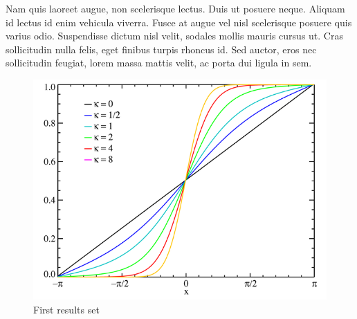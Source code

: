 Nam quis laoreet augue, non scelerisque lectus. Duis ut posuere neque. Aliquam id lectus id enim vehicula viverra. Fusce at augue vel nisl scelerisque posuere quis varius odio. Suspendisse dictum nisl velit, sodales mollis mauris cursus ut. Cras sollicitudin nulla felis, eget finibus turpis rhoncus id. Sed auctor, eros nec sollicitudin feugiat, lorem massa mattis velit, ac porta dui ligula in sem.

\begin{figure}[!ht]
\centering
\includegraphics[scale = 0.3]{images/results_1}
\caption{First results set}
\end{figure}

